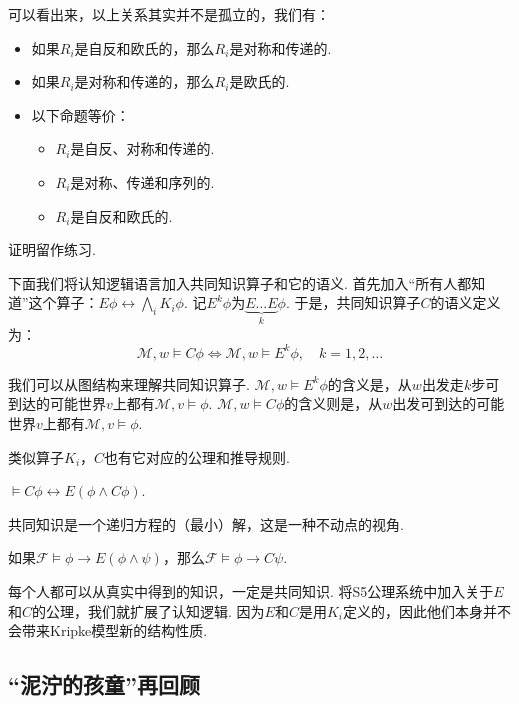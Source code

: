 可以看出来，以上关系其实并不是孤立的，我们有：
\begin{lemma} %
\begin{itemize}
    \item 如果$R_i$是自反和欧氏的，那么$R_i$是对称和传递的.
    \item 如果$R_i$是对称和传递的，那么$R_i$是欧氏的.
    \item 以下命题等价：
    \begin{itemize}
        \item $R_i$是自反、对称和传递的.
\item  $R_i$是对称、传递和序列的.
\item $R_i$是自反和欧氏的.
    \end{itemize}
\end{itemize}
\end{lemma}
证明留作练习.

下面我们将认知逻辑语言加入共同知识算子和它的语义. 首先加入“所有人都知道”这个算子：$E\phi\leftrightarrow\bigwedge_i K_i\phi$. 记$E^k\phi$为$\underbrace{E\dots E}_k\phi$. 于是，共同知识算子$C$的语义定义为：
    \[\mathcal M,w\vDash C\phi\iff\mathcal M,w\vDash E^k\phi,\quad k=1,2,\dots\]

我们可以从图结构来理解共同知识算子. $\mathcal M,w\vDash E^k\phi$的含义是，从$w$出发走$k$步可到达的可能世界$v$上都有$\mathcal M,v\vDash \phi$. $\mathcal M,w\vDash C\phi$的含义则是，从$w$出发可到达的可能世界$v$上都有$\mathcal M,v\vDash \phi$.

类似算子$K_i$，$C$也有它对应的公理和推导规则.
\begin{axiom}[不动点公理]
    $\vDash C\phi\leftrightarrow E(\phi\wedge C\phi)$.
\end{axiom}
共同知识是一个递归方程的（最小）解，这是一种不动点的视角.

\begin{principle}[归纳规则]
    如果$\mathcal F\vDash \phi\to E(\phi\wedge\psi)$，那么$\mathcal  F\vDash \phi\to C\psi$.    
\end{principle}

每个人都可以从真实中得到的知识，一定是共同知识. 将S5公理系统中加入关于$E$和$C$的公理，我们就扩展了认知逻辑. 因为$E$和$C$是用$K_i$定义的，因此他们本身并不会带来Kripke模型新的结构性质.

\subsection{“泥泞的孩童”再回顾}

